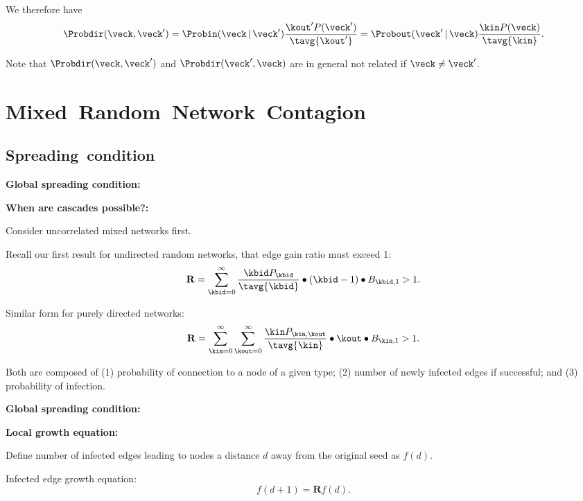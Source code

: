     
      We therefore have
      $$
      \Probdir(\veck,\veck')
      =
      \Probin(\veck\, |\, \veck') 
      \frac{\kout' P(\veck')}{\tavg{\kout'}}
      =
      \Probout(\veck'\, |\, \veck) 
      \frac{\kin P(\veck)}{\tavg{\kin}}.
      $$
    
      Note that 
      $
      \Probdir(\veck,\veck')
      $ 
      and
      $
      \Probdir(\veck',\veck)
      $
      are in general not related if $\veck \ne \veck'$.
    


\section{Mixed\ Random\ Network\ Contagion}

\subsection{Spreading\ condition}

  \textbf{Global spreading condition:\cite{dodds2011b}}

  \textbf{When are cascades possible?:}
    
    
      Consider uncorrelated mixed networks first.
    
      Recall our first result for undirected random networks,
      that edge gain ratio must exceed 1:
      $$
      \mathbf{R}
      =
      \sum_{\kbid=0}^{\infty}
      \frac{\kbid P_{\kbid}}{\tavg{\kbid}}
      \bullet
      (\kbid-1)
      \bullet
      B_{\kbid,1}
      >
      1.
      $$
    
      Similar form for purely directed networks:
      $$
      \mathbf{R}
      =
      \sum_{\kin=0}^{\infty}
      \sum_{\kout=0}^{\infty}
      \frac{\kin P_{\kin,\kout}}{\tavg{\kin}}
      \bullet
      \kout
      \bullet
      B_{\kin,1}
      >
      1.
      $$
    
      Both are composed of 
      (1) probability of connection
      to a node of a given type;
      (2) number of newly infected edges if successful;
      and 
      (3) probability of infection.
    
  

  \textbf{Global spreading condition:}
  
  \textbf{Local growth equation:}
    
    
      Define number of infected edges leading
      to nodes a distance $d$ away from the original seed
      as $f(d)$.
    
      Infected edge growth equation:
      $$
      f(d+1) = \mathbf{R} f(d).
      $$
    
